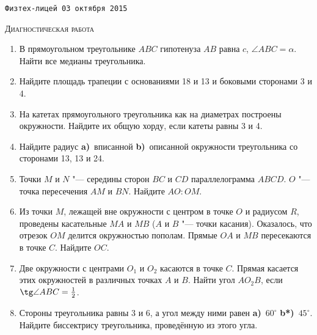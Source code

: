 \documentclass[a4paper, landscape, twocolumn, 11pt]{article}
\begin{document}
\begin{center}

\noindent\texttt{Физтех-лицей \hfill 03 октября 2015}

\vspace{-1ex}
\noindent\rule{0pt}{0pt}\hrulefill\rule{0pt}{0pt}

\bigskip

\textsc{\large Диагностическая работа}

\end{center}


\begin{enumerate}[\bf 1.]

\item В прямоугольном треугольнике $ABC$ гипотенуза $AB$ равна $c$, $\angle ABC = \alpha$. Найти все медианы треугольника.

\item Найдите площадь трапеции с основаниями 18 и 13 и боковыми сторонами 3 и 4.

\item На катетах прямоугольного треугольника как на диаметрах построены окружности. Найдите их общую хорду, если катеты равны 3 и 4.

\item Найдите радиус \textbf{a)}~вписанной \textbf{b)}~описанной окружности треугольника со сторонами 13, 13 и 24.

\item Точки $M$ и $N$ "--- середины сторон $BC$ и $CD$ параллелограмма $ABCD$. $O$ "--- точка пересечения $AM$ и $BN$. Найдите $AO:OM$.

\item Из точки $M$, лежащей вне окружности с центром в точке $O$ и радиусом $R$, проведены касательные $MA$ и $MB$ ($A$ и $B$ "--- точки касания). Оказалось, что отрезок $OM$ делится окружностью пополам. Прямые $OA$ и $MB$ пересекаются в точке $C$. Найдите $OC$.

\item Две окружности с центрами $O_1$ и $O_2$ касаются в точке $C$. Прямая касается этих окружностей в различных точках $A$ и $B$. Найти угол $AO_2B$, если $\tg \angle ABC = \frac12$.

\item Стороны треугольника равны 3 и 6, а угол между ними равен \textbf{a)}~$60^\circ$ \textbf{b*)}~$45^\circ$. Найдите биссектрису треугольника, проведённую из этого угла.

\end{enumerate}
\end{document}
